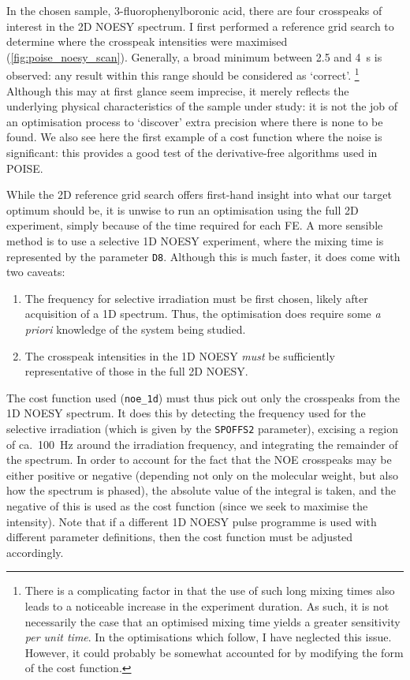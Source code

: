 In the chosen sample, 3-fluorophenylboronic acid, there are four crosspeaks of interest in the 2D NOESY spectrum.
I first performed a reference grid search to determine where the crosspeak intensities were maximised (\cref{fig:poise_noesy_scan}).
Generally, a broad minimum between 2.5 and \SI{4}{\s} is observed: any result within this range should be considered as `correct'.%
\footnote{There is a complicating factor in that the use of such long mixing times also leads to a noticeable increase in the experiment duration. As such, it is not necessarily the case that an optimised mixing time yields a greater sensitivity \textit{per unit time}. In the optimisations which follow, I have neglected this issue. However, it could probably be somewhat accounted for by modifying the form of the cost function.}
Although this may at first glance seem imprecise, it merely reflects the underlying physical characteristics of the sample under study: it is not the job of an optimisation process to `discover' extra precision where there is none to be found.
We also see here the first example of a cost function where the noise is significant: this provides a good test of the derivative-free algorithms used in POISE.

While the 2D reference grid search offers first-hand insight into what our target optimum should be, it is unwise to run an optimisation using the full 2D experiment, simply because of the time required for each FE.
A more sensible method is to use a selective 1D NOESY experiment, where the mixing time is represented by the parameter \texttt{D8}.
Although this is much faster, it does come with two caveats:
\begin{enumerate}
    \item The frequency for selective irradiation must be first chosen, likely after acquisition of a 1D \proton{} spectrum.
        Thus, the optimisation does require some \textit{a priori} knowledge of the system being studied.
    \item The crosspeak intensities in the 1D NOESY \textit{must} be sufficiently representative of those in the full 2D NOESY.
\end{enumerate}

The cost function used (\texttt{noe\_1d}) must thus pick out only the crosspeaks from the 1D NOESY spectrum.
It does this by detecting the frequency used for the selective irradiation (which is given by the \texttt{SPOFFS2} parameter), excising a region of ca.\ \SI{100}{\Hz} around the irradiation frequency, and integrating the remainder of the spectrum.
In order to account for the fact that the NOE crosspeaks may be either positive or negative (depending not only on the molecular weight, but also how the spectrum is phased), the absolute value of the integral is taken, and the negative of this is used as the cost function (since we seek to maximise the intensity).
Note that if a different 1D NOESY pulse programme is used with different parameter definitions, then the cost function must be adjusted accordingly.


